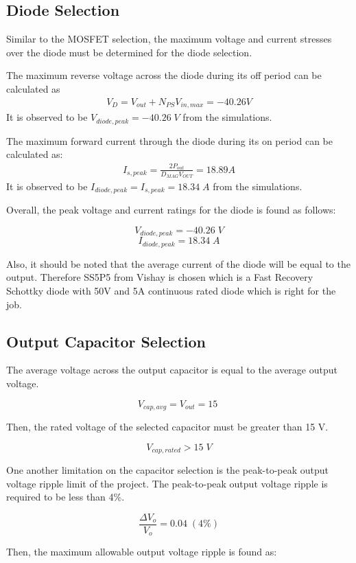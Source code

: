 \subsection{Diode Selection}
Similar to the MOSFET selection, the maximum voltage and current stresses over the diode must be determined for the diode selection.

The maximum reverse voltage across the diode during its off period can be calculated as
\begin{align*}
    V_D=V_{out}+N_{PS}V_{in,max}=-40.26V
\end{align*}
It is observed to be $ V_{diode,peak} = -40.26\;V $ from the simulations.

The maximum forward current through the diode during its on period can be calculated as:
\begin{align*}
    I_{s,peak}=\frac{2P_{out}}{D_{MAG}V_{OUT}}=18.89A
\end{align*} It is observed to be $ I_{diode,peak} = I_{s,peak} = 18.34\;A $ from the simulations.

Overall, the peak voltage and current ratings for the diode is found as follows:

$$ V_{diode,peak} = -40.26\;V $$
$$ I_{diode,peak} = 18.34\;A $$

Also, it should be noted that the average current of the diode will be equal to the output. Therefore SS5P5 from Vishay is chosen which is a Fast Recovery Schottky diode with 50V and 5A continuous rated diode which is right for the job.

\subsection{Output Capacitor Selection}
The average voltage across the output capacitor is equal to the average output voltage.

$$ V_{cap,avg} = V_{out} = 15\; $$

Then, the rated voltage of the selected capacitor must be greater than 15 V.

$$ V_{cap,rated} > 15\;V $$

One another limitation on the capacitor selection is the peak-to-peak output voltage ripple limit of the project. The peak-to-peak output voltage ripple is required to be less than 4\%.

$$ \frac{\Delta V_o }{V_o} = 0.04\;(4\%) $$

Then, the maximum allowable output voltage ripple is found as:

